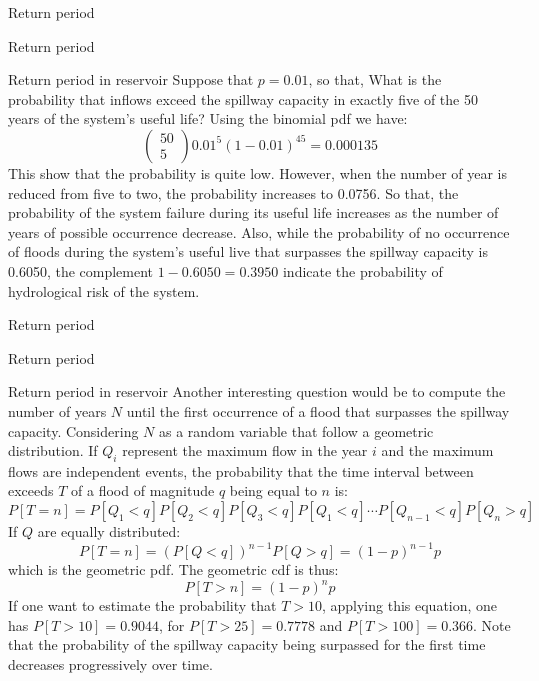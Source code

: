 \documentclass[8pt]{beamer}
\renewcommand{\emph}[1]{\textcolor{myorange}{#1}}
\begin{document}
\begin{frame}{Return period}
    \begin{block}{Return period}
 \begin{exampleblock}{Return period in reservoir} %
       Suppose that $p=0.01$, so that, What is the probability that inflows exceed the spillway capacity in exactly five of the 50 years of the system’s useful life? Using the binomial \emph{pdf} we have:
     \[
         \left( \begin{array}{c} 50 \\ 5 \end{array} \right) 0.01^5 (1-0.01)^{45} = 0.000135
     \]
     This show that the probability is quite low. However, when the number of year is reduced from five to two, the probability increases to 0.0756. So that, the probability of the system failure during its useful life increases as the number of years of possible occurrence decrease. Also, while the probability of no occurrence of floods during the system's useful live that surpasses the spillway capacity is 0.6050, the complement $1-0.6050 = 0.3950$ indicate the probability of hydrological risk of the system. 
 \end{exampleblock}
    \end{block}
\end{frame}

\begin{frame}{Return period}
    \begin{block}{Return period}
 \begin{exampleblock}{Return period in reservoir} %
    Another interesting question would be to compute the number of years $N$ until the first occurrence of a flood that surpasses the spillway capacity. Considering $N$ as a random variable that follow a \emph{geometric distribution}. If $Q_i$ represent the maximum flow in the year $i$ and the maximum flows are independent events, the probability that the time interval between exceeds $T$ of a flood of magnitude $q$ being equal to $n$ is:
     \[
         P[T= n] = P[Q_1 < q]P[Q_2 < q]P[Q_3 < q]P[Q_1 < q] \cdots P[Q_{n-1} < q] P[Q_n > q]
     \]
     If $Q$ are equally distributed:
     \[
         P[T= n] = \left( P[Q < q] \right)^{n-1} P[Q > q] = (1-p)^{n-1} p
     \]
     which is the \emph{geometric pdf}. The \emph{geometric cdf} is thus:
     \[
         P[T > n] =  (1-p)^{n} p
     \]
     If one want to estimate the probability that $T>10$, applying this equation, one has $P[T>10] = 0.9044$, for $P[T>25] = 0.7778$ and $P[T>100] = 0.366$. Note that the probability of the spillway capacity being surpassed for the first time decreases progressively over time.
 \end{exampleblock}
    \end{block}
\end{frame}
\end{document}
